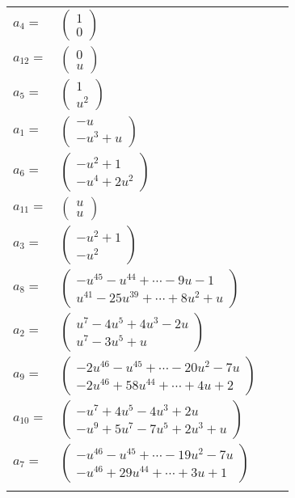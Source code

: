 \documentclass[1p]{elsarticle_modified}
\theoremstyle{definition}
\begin{document}
\begin{tabular}{m{7pt} m{180pt} m{7pt} m{180pt} }
\flushright $a_{4}=$&$\begin{pmatrix}1\\0\end{pmatrix}$ \\
\flushright $a_{12}=$&$\begin{pmatrix}0\\u\end{pmatrix}$ \\
\flushright $a_{5}=$&$\begin{pmatrix}1\\u^2\end{pmatrix}$ \\
\flushright $a_{1}=$&$\begin{pmatrix}- u\\- u^3+u\end{pmatrix}$ \\
\flushright $a_{6}=$&$\begin{pmatrix}- u^2+1\\- u^4+2 u^2\end{pmatrix}$ \\
\flushright $a_{11}=$&$\begin{pmatrix}u\\u\end{pmatrix}$ \\
\flushright $a_{3}=$&$\begin{pmatrix}- u^2+1\\- u^2\end{pmatrix}$ \\
\flushright $a_{8}=$&$\begin{pmatrix}- u^{45}- u^{44}+\cdots-9 u-1\\u^{41}-25 u^{39}+\cdots+8 u^2+u\end{pmatrix}$ \\
\flushright $a_{2}=$&$\begin{pmatrix}u^7-4 u^5+4 u^3-2 u\\u^7-3 u^5+u\end{pmatrix}$ \\
\flushright $a_{9}=$&$\begin{pmatrix}-2 u^{46}- u^{45}+\cdots-20 u^2-7 u\\-2 u^{46}+58 u^{44}+\cdots+4 u+2\end{pmatrix}$ \\
\flushright $a_{10}=$&$\begin{pmatrix}- u^7+4 u^5-4 u^3+2 u\\- u^9+5 u^7-7 u^5+2 u^3+u\end{pmatrix}$ \\
\flushright $a_{7}=$&$\begin{pmatrix}- u^{46}- u^{45}+\cdots-19 u^2-7 u\\- u^{46}+29 u^{44}+\cdots+3 u+1\end{pmatrix}$\\&\end{tabular}
\end{document}
